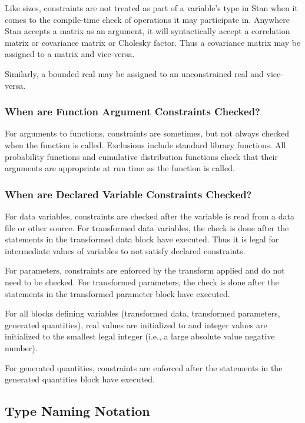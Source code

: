 Like sizes, constraints are not treated as part of a variable's type
in Stan when it comes to the compile-time check of operations it may
participate in.  Anywhere Stan accepts a matrix as an argument, it
will syntactically accept a correlation matrix or covariance matrix or
Cholesky factor.  Thus a covariance matrix may be assigned to a matrix
and vice-versa.

Similarly, a bounded real may be assigned to an unconstrained real and
vice-versa.

\subsubsection{When are Function Argument Constraints Checked?}

For arguments to functions, constraints are sometimes, but not always
checked when the function is called.  Exclusions include \Cpp standard
library functions.  All probability functions and cumulative
distribution functions check that their arguments are appropriate at
run time as the function is called.

\subsubsection{When are Declared Variable Constraints Checked?}

For data variables, constraints are checked after the variable is read
from a data file or other source.  For transformed data variables, the
check is done after the statements in the transformed data block have
executed.  Thus it is legal for intermediate values of variables to
not satisfy declared constraints.

For parameters, constraints are enforced by the transform applied and
do not need to be checked.  For transformed parameters, the check is
done after the statements in the transformed parameter block have
executed.

For all blocks defining variables (transformed data, transformed
parameters, generated quantities), real values are initialized to
 and integer values are initialized to the smallest legal
integer (i.e., a large absolute value negative number).

For generated quantities, constraints are enforced after the
statements in the generated quantities block have executed.


\subsection{Type Naming Notation}

